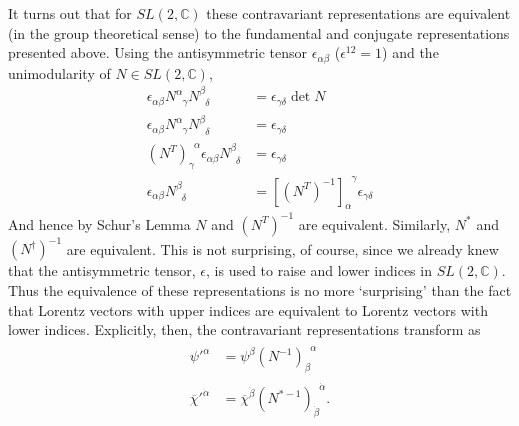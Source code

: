 \documentclass[12pt, oneside]{report}    %
\begin{document}
It turns out that for $SL(2,\mathbb{C})$ these contravariant representations are equivalent (in the group theoretical sense) to the fundamental and conjugate representations presented above. Using the antisymmetric tensor $\epsilon_{\alpha\beta}$ ($\epsilon^{12}=1$) and the unimodularity of $N\in SL(2,\mathbb C)$,
\begin{align}
    \epsilon_{\alpha\beta}N^\alpha_{\phantom\alpha\gamma}N^\beta_{\phantom\beta\delta} &= \epsilon_{\gamma\delta}\det N\\
    \epsilon_{\alpha\beta}N^\alpha_{\phantom\alpha\gamma}N^\beta_{\phantom\beta\delta} &= \epsilon_{\gamma\delta}\\
    \left(N^T\right)_{\gamma}^{\phantom\gamma\alpha}\epsilon_{\alpha\beta}N^\beta_{\phantom\beta\delta} &= \epsilon_{\gamma\delta}\\
    \epsilon_{\alpha\beta}N^\beta_{\phantom\beta\delta} &= \left[\left(N^T\right)^{-1}\right]_{\alpha}^{\phantom\alpha\gamma}\epsilon_{\gamma\delta}
\end{align}
%
And hence by Schur's Lemma $N$ and $(N^T)^{-1}$ are equivalent. Similarly, $N^*$ and $(N^\dag)^{-1}$ are equivalent. This is not surprising, of course, since we already knew that the antisymmetric tensor, $\epsilon$, is used to raise and lower indices in $SL(2,\mathbb C)$. Thus the equivalence of these representations is no more `surprising' than the fact that Lorentz vectors with upper indices are equivalent to Lorentz vectors with lower indices. Explicitly, then, the contravariant representations transform as
\begin{align}
    \psi'^\alpha &= \psi^\beta(N^{-1})_\beta^{\phantom\beta\alpha}\\
    \overline{\chi}'^{\dot{\alpha}} &= \overline{\chi}^{\dot{\beta}}(N^{*-1})_{\dot{\beta}}^{\phantom{\dot{\beta}}\dot{\alpha}}.
\end{align}
\end{document}
